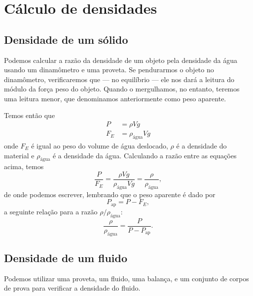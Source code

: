 \section{Cálculo de densidades}

\subsection{Densidade de um sólido}

Podemos calcular a razão da densidade de um objeto pela densidade da água usando um dinamômetro e uma proveta. Se pendurarmos o objeto no dinamômetro, verificaremos que --- no equilíbrio --- ele nos dará a leitura do módulo da força peso do objeto. Quando o mergulhamos, no entanto, teremos uma leitura menor, que denominamos anteriormente como peso aparente.

Temos então que
\begin{align}
	P &= \rho Vg \\
	F_E &= \rho_{\textrm{água}} V g
\end{align}
%
onde $F_E$ é igual ao peso do volume de água deslocado, $\rho$ é a densidade do material e $\rho_{\textrm{água}}$ é a densidade da água. Calculando a razão entre as equações acima, temos
\begin{equation}
	\frac{P}{F_E} = \frac{\rho Vg}{\rho_{\textrm{água}}Vg} = \frac{\rho}{\rho_{\textrm{água}}},
\end{equation}
%
de onde podemos escrever, lembrando que o peso aparente é dado por
\begin{equation}
	P_{\textrm{ap}} = P - F_E,
\end{equation}
%
a seguinte relação para a razão $\rho/\rho_{\textrm{água}}$:
\begin{equation}\label{Eq:DensRelativa}
	\frac{\rho}{\rho_{\textrm{água}}} = \frac{P}{P-P_{\textrm{ap}}}.
\end{equation}

\subsection{Densidade de um fluido}

Podemos utilizar uma proveta, um fluido, uma balança, e um conjunto de corpos de prova para verificar a densidade do fluido.


